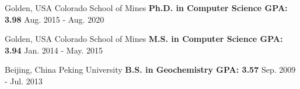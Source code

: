 \vspace{-.15in}
\renewcommand{\arraystretch}{1}

\begin{cventries}
	\cveduentry
		{Golden, USA} %
	{Colorado School of Mines} %
	{\textbf{Ph.D. in Computer Science  \qquad  GPA: 3.98}} 
	{Aug. 2015 - Aug. 2020} %
	
	
	\cveduentry
	{Golden, USA} %
	{Colorado School of Mines} %
		{\textbf{M.S. in Computer Science \qquad GPA: 3.94}} %
		{Jan. 2014 - May. 2015} %
	
	
	\cveduentry
		{Beijing, China} %
	{Peking University} %
	{\textbf{B.S. in Geochemistry  \qquad GPA: 3.57}} %
	{Sep. 2009 - Jul. 2013} %

\end{cventries}
